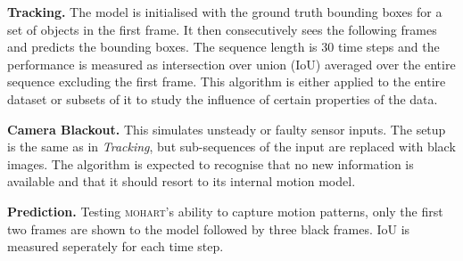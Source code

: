 \textbf{Tracking.} The model is initialised with the ground truth bounding boxes for a set of objects in the first frame. It then consecutively sees the following frames and predicts the bounding boxes. The sequence length is 30 time steps and the performance is measured as intersection over union (IoU) averaged over the entire sequence excluding the first frame. This algorithm is either applied to the entire dataset or subsets of it to study the influence of certain properties of the data.

\textbf{Camera Blackout.} This simulates unsteady or faulty sensor inputs. The setup is the same as in 
\textit{Tracking}, but sub-sequences of the input are replaced with black images. The algorithm is expected to recognise that no new information is available and that it should resort to its internal motion model.

\textbf{Prediction.} Testing \textsc{mohart}'s ability to capture motion patterns, only the first two frames are shown to the model followed by three black frames. IoU is measured seperately for each time step.



